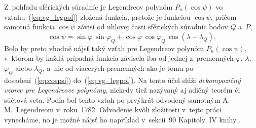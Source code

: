 \documentclass[a4paper,12pt]{book}
\begin{document}
Z~pohľadu sférických súradníc je Legendreov polynóm $P_n(\cos\psi)$ vo 
vzťahu~(\ref{eq:vg_legpol}) zložená funkcia, pretože je funkciou $\cos\psi$, 
pričom samotná funkcia $\cos\psi$ závisí od uhlovej časti sférických súradníc 
bodov $Q$ a~$P$,
%
\begin{equation}
\label{eq:cospsi}
\cos\psi = \sin\varphi \, \sin\varphi_Q + \cos\varphi \, \cos\varphi_Q \,
\cos(\lambda - \lambda_Q){.}
\end{equation}
%
Bolo by preto vhodné nájsť taký vzťah pre Legendreov polynóm $P_n(\cos\psi)$,
v~ktorom by každá prípadná funkcia závisela iba od jednej z~premenných
$\varphi$, $ \lambda$, $\varphi_Q$ alebo $\lambda_Q$, a~nie od viacerých
premenných ako je tomu po dosadení~(\ref{eq:cospsi})
do~(\ref{eq:vg_legpol}).  Na tento účel slúži \emph{dekompozičný vzorec pre
Legendreove polynómy}, niekedy tiež nazývaný aj adičný teorém či súčtová veta.
Podľa \textcite{Hobson} bol tento vzťah po prvýkrát odvodený samotným
A.--M.~Legendreom v~roku~1782.  Odvodenie kvôli zložitosti v~tejto práci
vynecháme, no je možné nájsť ho napríklad v~sekcii~90 Kapitoly~IV knihy
\textcite{Hobson}.
\end{document}
